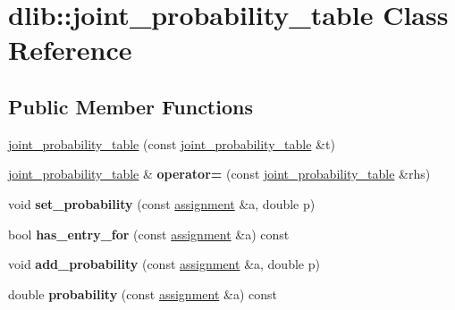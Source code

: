\hypertarget{classdlib_1_1joint__probability__table}{
\section{dlib::joint\_\-probability\_\-table Class Reference}
\label{classdlib_1_1joint__probability__table}
}
\subsection*{Public Member Functions}
\begin{DoxyCompactItemize}
\item 
\hyperlink{classdlib_1_1joint__probability__table_a68ba392924a2080a56d0246b7b01b7a2}{joint\_\-probability\_\-table} (const \hyperlink{classdlib_1_1joint__probability__table}{joint\_\-probability\_\-table} \&t)
\item 
\hypertarget{classdlib_1_1joint__probability__table_aee768f051adb65237a6312e6b6ba721d}{
\hyperlink{classdlib_1_1joint__probability__table}{joint\_\-probability\_\-table} \& {\bfseries operator=} (const \hyperlink{classdlib_1_1joint__probability__table}{joint\_\-probability\_\-table} \&rhs)}
\label{classdlib_1_1joint__probability__table_aee768f051adb65237a6312e6b6ba721d}

\item 
\hypertarget{classdlib_1_1joint__probability__table_a678d75a7ad42da9aae974547278abc4f}{
void {\bfseries set\_\-probability} (const \hyperlink{classdlib_1_1assignment}{assignment} \&a, double p)}
\label{classdlib_1_1joint__probability__table_a678d75a7ad42da9aae974547278abc4f}

\item 
\hypertarget{classdlib_1_1joint__probability__table_acfd6d1ce03bf921ec68b517ed3274c77}{
bool {\bfseries has\_\-entry\_\-for} (const \hyperlink{classdlib_1_1assignment}{assignment} \&a) const }
\label{classdlib_1_1joint__probability__table_acfd6d1ce03bf921ec68b517ed3274c77}

\item 
\hypertarget{classdlib_1_1joint__probability__table_af9edf3c0a627e056c568d9bab7b0aeaa}{
void {\bfseries add\_\-probability} (const \hyperlink{classdlib_1_1assignment}{assignment} \&a, double p)}
\label{classdlib_1_1joint__probability__table_af9edf3c0a627e056c568d9bab7b0aeaa}

\item 
\hypertarget{classdlib_1_1joint__probability__table_a799394abc1dcfe9e840a56dc53271408}{
double {\bfseries probability} (const \hyperlink{classdlib_1_1assignment}{assignment} \&a) const }
\label{classdlib_1_1joint__probability__table_a799394abc1dcfe9e840a56dc53271408}


\end{DoxyCompactItemize}
